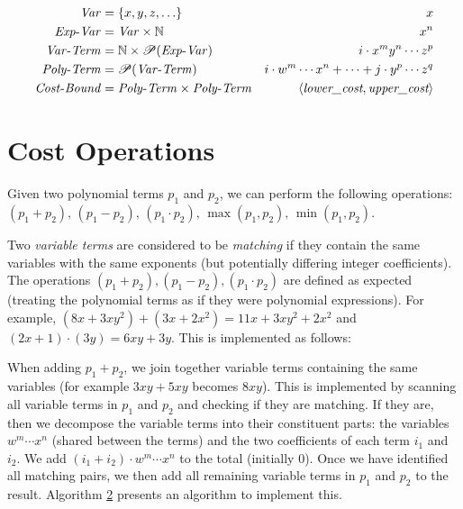 \begin{align*}
  \mathit{Var}               & = \{x, y, z, \ldots \}                                          & x                                                                \\
  \mathit{Exp\text{-}Var}    & = \mathit{Var}\times \mathbb{N}                                 & x^n                                                              \\
  \mathit{Var\text{-}Term}   & = \mathbb{N} \times \mathscr{P}(\mathit{Exp\text{-}Var})        & i \cdot x^m y^n \cdots z^p                                       \\
  \mathit{Poly\text{-}Term}  & = \mathscr{P}(\mathit{Var\text{-}Term})                         & i \cdot {w^m} \cdots {x^n} + \cdots + j \cdot {y^p} \cdots {z^q} \\
  \mathit{Cost\text{-}Bound} & = \mathit{Poly\text{-}Term}    \times \mathit{Poly\text{-}Term} & \langle{\textit{lower\_cost}, \textit{upper\_cost}}\rangle
\end{align*}

\section*{Cost Operations}

Given two polynomial terms \( p_1 \) and \( p_2 \), we can perform the following operations: \( {(p_1 + p_2)}, \, {(p_1 - p_2)}, \, {(p_1 \cdot p_2)}, \, {\max(p_1, p_2)}, \, {\min(p_1, p_2)} \).

Two \textit{variable terms} are considered to be \textit{matching} if they contain the same variables with the same exponents (but potentially differing integer coefficients). The operations \( {(p_1 + p_2)}, {(p_1 - p_2)}, {(p_1 \cdot p_2)} \) are defined as expected (treating the polynomial terms as if they were polynomial expressions). For example, \( (8x + 3xy^2) + (3x + 2x^2) = 11x + 3xy^2 + 2x^2 \) and \( (2x + 1) \cdot (3y) = 6xy + 3y\). This is implemented as follows:

When adding \( p_1 + p_2 \), we join together variable terms containing the same variables (for example \( 3xy + 5xy \) becomes \( 8xy \)). This is implemented by scanning all variable terms in \( p_1 \) and \( p_2 \) and checking if they are matching. If they are, then we decompose the variable terms into their constituent parts: the variables \( w^m \cdots x^n \) (shared between the terms) and the two coefficients of each term \( i_1 \) and \( i_2 \). We add \( (i_1 + i_2) \cdot w^m \cdots x^n \) to the total (initially 0). Once we have identified all matching pairs, we then add all remaining variable terms in \( p_1 \) and \( p_2 \) to the result. Algorithm \hyperref[alg:two]{2} presents an algorithm to implement this.

